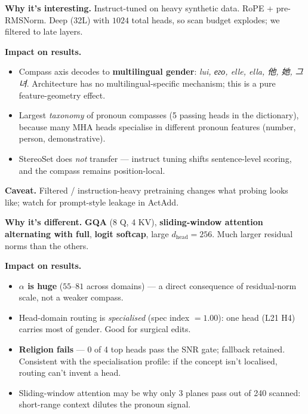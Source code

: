 \documentclass[11pt]{article}
\begin{document}
\begin{minipage}[t]{0.245\linewidth}
\begin{tcolorbox}[modelbox, colframe=phi3c, title={\textcolor{phi3c}{Phi-3-mini} --- the multilingual payoff}]
\textbf{Why it's interesting.} Instruct-tuned on heavy synthetic data. RoPE
+ pre-RMSNorm. Deep (32L) with $1024$ total heads, so scan budget explodes;
we filtered to late layers.

\textbf{Impact on results.}
\begin{itemize}
    \item Compass axis decodes to \textbf{multilingual gender}: \emph{lui, его, elle, ella, 他, 她, 그녀}. Architecture has no multilingual-specific mechanism; this is a pure feature-geometry effect.
    \item Largest \emph{taxonomy} of pronoun compasses (5 passing heads in the dictionary), because many MHA heads specialise in different pronoun features (number, person, demonstrative).
    \item StereoSet does \emph{not} transfer --- instruct tuning shifts sentence-level scoring, and the compass remains position-local.
\end{itemize}

\textbf{Caveat.} Filtered / instruction-heavy pretraining changes what probing looks like; watch for prompt-style leakage in ActAdd.
\end{tcolorbox}
\end{minipage}%
\hfill
\begin{minipage}[t]{0.245\linewidth}
\begin{tcolorbox}[modelbox, colframe=gemmac, title={\textcolor{gemmac}{Gemma-2-2B} --- the specialised one}]
\textbf{Why it's different.} \textbf{GQA} (8 Q, 4 KV), \textbf{sliding-window attention alternating with full}, \textbf{logit softcap}, large $d_\text{head}=256$. Much larger residual norms than the others.

\textbf{Impact on results.}
\begin{itemize}
    \item \textbf{$\alpha$ is huge} ($55$--$81$ across domains) --- a direct consequence of residual-norm scale, not a weaker compass.
    \item Head-domain routing is \emph{specialised} (spec index $= 1.00$): one head (L21 H4) carries most of gender. Good for surgical edits.
    \item \textbf{Religion fails} --- 0 of 4 top heads pass the SNR gate; fallback retained. Consistent with the specialisation profile: if the concept isn't localised, routing can't invent a head.
    \item Sliding-window attention may be why only 3 planes pass out of 240 scanned: short-range context dilutes the pronoun signal.
\end{itemize}
\end{tcolorbox}
\end{minipage}%
\end{document}
